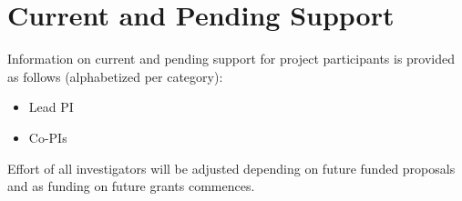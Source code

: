 \section{Current and Pending Support}
\label{sec:support}

\bigskip
\noindent

\bigskip
Information on current and pending support for project participants is provided
as follows (alphabetized per category):
\begin{itemize}
\item Lead PI
\item Co-PIs
\end{itemize}

\bigskip
Effort of all investigators will be adjusted depending on future funded
proposals and as funding on future grants commences.

